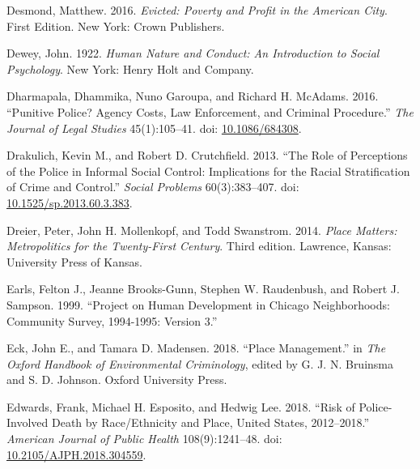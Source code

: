 \documentclass [11pt, proquest] {uwthesis}[2015/03/03]
\newlength{\cslhangindent}
\newenvironment{CSLReferences}[2]%
{\setlength{\parindent}{0pt}%
\everypar{\setlength{\hangindent}{\cslhangindent}}\ignorespaces}%
{\par}
\begin{document}
\begin{CSLReferences}{1}{0}
\leavevmode\hypertarget{ref-desmondEvictedPovertyProfit2016}{}%
Desmond, Matthew. 2016. \emph{Evicted: Poverty and Profit in the {American} City}. First Edition. {New York}: {Crown Publishers}.

\leavevmode\hypertarget{ref-deweyHumanNatureConduct1922}{}%
Dewey, John. 1922. \emph{Human {Nature} and {Conduct}: {An Introduction} to {Social Psychology}}. {New York}: {Henry Holt and Company}.

\leavevmode\hypertarget{ref-dharmapalaPunitivePoliceAgency2016}{}%
Dharmapala, Dhammika, Nuno Garoupa, and Richard H. McAdams. 2016. {``Punitive {Police}? {Agency Costs}, {Law Enforcement}, and {Criminal Procedure}.''} \emph{The Journal of Legal Studies} 45(1):105--41. doi: \href{https://doi.org/10.1086/684308}{10.1086/684308}.

\leavevmode\hypertarget{ref-drakulichRolePerceptionsPolice2013}{}%
Drakulich, Kevin M., and Robert D. Crutchfield. 2013. {``The {Role} of {Perceptions} of the {Police} in {Informal Social Control}: {Implications} for the {Racial Stratification} of {Crime} and {Control}.''} \emph{Social Problems} 60(3):383--407. doi: \href{https://doi.org/10.1525/sp.2013.60.3.383}{10.1525/sp.2013.60.3.383}.

\leavevmode\hypertarget{ref-dreierPlaceMattersMetropolitics2014}{}%
Dreier, Peter, John H. Mollenkopf, and Todd Swanstrom. 2014. \emph{Place {Matters}: {Metropolitics} for the {Twenty}-{First Century}}. Third edition. {Lawrence, Kansas}: {University Press of Kansas}.

\leavevmode\hypertarget{ref-earlsProjectHumanDevelopment1999}{}%
Earls, Felton J., Jeanne Brooks-Gunn, Stephen W. Raudenbush, and Robert J. Sampson. 1999. {``Project on {Human Development} in {Chicago Neighborhoods}: {Community Survey}, 1994-1995: {Version} 3.''}

\leavevmode\hypertarget{ref-eckPlaceManagement2018b}{}%
Eck, John E., and Tamara D. Madensen. 2018. {``Place {Management}.''} in \emph{The {Oxford Handbook} of {Environmental Criminology}}, edited by G. J. N. Bruinsma and S. D. Johnson. {Oxford University Press}.

\leavevmode\hypertarget{ref-edwardsRiskPoliceInvolvedDeath2018}{}%
Edwards, Frank, Michael H. Esposito, and Hedwig Lee. 2018. {``Risk of {Police}-{Involved Death} by {Race}/{Ethnicity} and {Place}, {United States}, 2012--2018.''} \emph{American Journal of Public Health} 108(9):1241--48. doi: \href{https://doi.org/10.2105/AJPH.2018.304559}{10.2105/AJPH.2018.304559}.


\end{CSLReferences}
\end{document}
